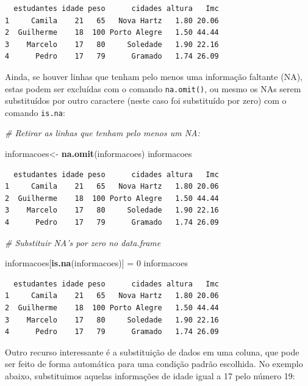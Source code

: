 \documentclass[12pt,brazil,oneside]{book}
\newenvironment{Shaded}{\begin{snugshade}}{\end{snugshade}}
\newcommand{\CommentTok}[1]{\textcolor[rgb]{0.56,0.35,0.01}{\textit{#1}}}
\newcommand{\DecValTok}[1]{\textcolor[rgb]{0.00,0.00,0.81}{#1}}
\newcommand{\KeywordTok}[1]{\textcolor[rgb]{0.13,0.29,0.53}{\textbf{#1}}}
\newcommand{\NormalTok}[1]{#1}
\newcommand{\StringTok}[1]{\textcolor[rgb]{0.31,0.60,0.02}{#1}}
\begin{document}
\begin{verbatim}
  estudantes idade peso      cidades altura   Imc
1     Camila    21   65   Nova Hartz   1.80 20.06
2  Guilherme    18  100 Porto Alegre   1.50 44.44
3    Marcelo    17   80     Soledade   1.90 22.16
4      Pedro    17   79      Gramado   1.74 26.09
\end{verbatim}

Ainda, se houver linhas que tenham pelo menos uma informação faltante
(NA), estas podem ser excluídas com o comando \texttt{na.omit()}, ou
mesmo os NAs serem substituídos por outro caractere (neste caso foi
substituído por zero) com o comando \texttt{is.na}:

\begin{Shaded}
\begin{Highlighting}[]
\CommentTok{# Retirar as linhas que tenham pelo menos um NA:}

\NormalTok{informacoes<-}\StringTok{ }\KeywordTok{na.omit}\NormalTok{(informacoes)}
\NormalTok{informacoes}
\end{Highlighting}
\end{Shaded}

\begin{verbatim}
  estudantes idade peso      cidades altura   Imc
1     Camila    21   65   Nova Hartz   1.80 20.06
2  Guilherme    18  100 Porto Alegre   1.50 44.44
3    Marcelo    17   80     Soledade   1.90 22.16
4      Pedro    17   79      Gramado   1.74 26.09
\end{verbatim}

\begin{Shaded}
\begin{Highlighting}[]
\CommentTok{# Substituir NA's por zero no data.frame}

\NormalTok{informacoes[}\KeywordTok{is.na}\NormalTok{(informacoes)] =}\StringTok{ }\DecValTok{0}
\NormalTok{informacoes}
\end{Highlighting}
\end{Shaded}

\begin{verbatim}
  estudantes idade peso      cidades altura   Imc
1     Camila    21   65   Nova Hartz   1.80 20.06
2  Guilherme    18  100 Porto Alegre   1.50 44.44
3    Marcelo    17   80     Soledade   1.90 22.16
4      Pedro    17   79      Gramado   1.74 26.09
\end{verbatim}

Outro recurso interessante é a substituição de dados em uma coluna, que
pode ser feito de forma automática para uma condição padrão escolhida.
No exemplo abaixo, substituimos aquelas informações de idade igual a 17
pelo número 19:
\end{document}
